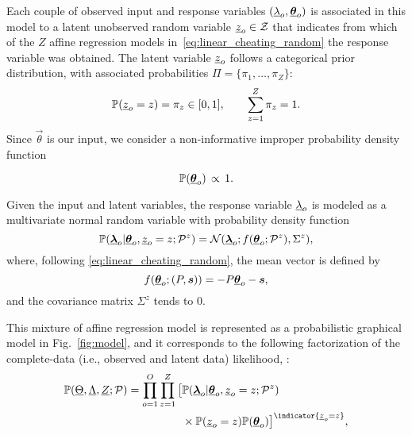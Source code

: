 \documentclass{ifacconf}  %
\begin{document}
Each couple of observed input and response variables $(    \underline{\lambda}_{o}, {\underline{\boldsymbol{\theta}}}_{o})$ is associated in this model to a latent unobserved random variable ${\underline{z}_{o}\in\mathcal{Z}}$ that indicates from which of the $Z$ affine regression models in~\eqref{eq:linear_cheating_random} the response variable was obtained.
The latent variable $\underline{z}_{o}$ follows a categorical prior distribution, with associated probabilities ${\Pi=\{\pi_{1},\dots,\pi_{Z}\}}$:
   \begin{equation}
     \label{eq:prob_zo_equal_z}
\mathbb{P}(\underline{z}_{o}=z)=\pi_{z} \in [0,1], \qquad \sum_{z=1}^{Z} \pi_{z} = 1.
\end{equation}
Since $\vec{\theta}$ is our input,
we consider a non-informative improper probability density function~\cite{ChristensenEtAl2010}

\begin{equation}
  \label{eq:theta_almost_surely}
  \mathbb{P}({\underline{\boldsymbol{\theta}}}_{o}) \,\propto \,1.
\end{equation}

Given the input and latent variables, the response variable $\underline{\lambda}_{o}$ is modeled as a multivariate normal random variable with probability density function
\begin{equation}
  \label{eq:multivariate_gaussian}
\mathbb{P}({\underline{\boldsymbol{\lambda}}}_{o}|{\underline{\boldsymbol{\theta}}}_{o},\underline{z}_{o}=z; \mathcal{P}^{z}) = \mathcal{N}({\underline{\boldsymbol{\lambda}}}_{o};f({\underline{\boldsymbol{\theta}}}_{o};\mathcal{P}^{z}),{\Sigma^{z}}),
\end{equation}
where, following \eqref{eq:linear_cheating_random}, the mean vector is defined by
\[f({\underline{\boldsymbol{\theta}}}_{o};(P,\boldsymbol{s}))=-{P}{\underline{\boldsymbol{\theta}}}_{o}-{\boldsymbol{s}},\]
and the covariance matrix ${\Sigma^{z}}$ tends to $0$.

This mixture of affine regression model is represented as a probabilistic graphical model in Fig.~\ref{fig:model}, and it corresponds to the following factorization of the complete-data (i.e., observed and latent data) likelihood, \cite{Bishop2006}:
\begin{align}\label{eq:completedataLikelihood}
  \probability{\random{\Theta},\random{\Lambda},\random{Z};\set{P}}= \prod_{o=1}^{O}\prod_{z=1}^{Z}\big[&\probability{\randomvec{\lambda}_{o}|\randomvec{\theta}_{o},\random{z}_{o}=z;\set{P}^{z}} \nonumber \\
& \times \probability{\random{z}_{o}=z}\probability{\randomvec{\theta}_{o}}\big]^{\indicator{\random{z}_{o}=z}},
\end{align}
\end{document}
